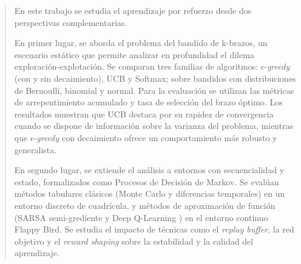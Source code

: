 \renewcommand{\abstractname}{Resumen}

\begin{abstract}
    En este trabajo se estudia el aprendizaje por refuerzo desde dos perspectivas complementarias. 
    
    En primer lugar, se aborda el problema del bandido de k-brazos, un escenario estático que permite analizar en profundidad el dilema exploración-explotación. Se comparan tres familias de algoritmos: $\epsilon$-\textit{greedy} (con y sin decaimiento), UCB y Softmax; sobre bandidos con distribuciones de Bernoulli, binomial y normal. Para la evaluación se utilizan las métricas de arrepentimiento acumulado y tasa de selección del brazo óptimo. Los resultados muestran que UCB destaca por su rapidez de convergencia cuando se dispone de información sobre la varianza del problema, mientras que $\epsilon$-\textit{greedy} con decaimiento ofrece un comportamiento más robusto y generalista.

    En segundo lugar, se extiende el análisis a entornos con secuencialidad y estado, formalizados como Procesos de Decisión de Markov. Se evalúan métodos tabulares clásicos (Monte Carlo y diferencias temporales) en un entorno discreto de cuadrícula, y métodos de aproximación de función (SARSA semi-grediente y Deep Q-Learning ) en el entorno continuo Flappy Bird. Se estudia el impacto de técnicas como el \textit{replay buffer}, la red objetivo y el \textit{reward shaping} sobre la estabilidad y la calidad del aprendizaje.
 \end{abstract}